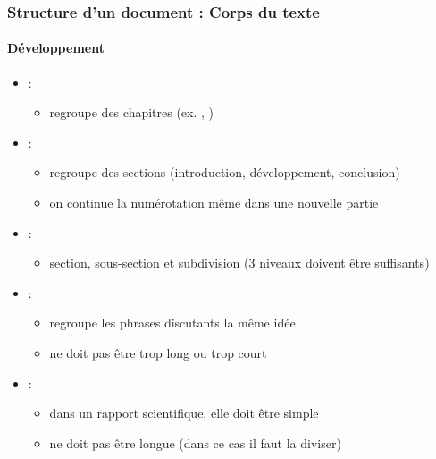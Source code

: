 \documentclass[xcolor=table]{beamer}
\begin{document}
\begin{frame}
\frametitle{Structure d'un document : Corps du texte}
\framesubtitle{Développement}

\begin{itemize}
	\item {} : 
	\begin{itemize}
		\item regroupe des chapitres (ex. , ) 
	\end{itemize}

	\item {} :
	\begin{itemize}
		\item regroupe des sections (introduction, développement, conclusion)
		\item on continue la numérotation même dans une nouvelle partie
	\end{itemize}

	\item {} : 
	\begin{itemize}
		\item section, sous-section et subdivision (3 niveaux doivent être suffisants)
	\end{itemize}

	\item {} : 
	\begin{itemize}
		\item regroupe les phrases discutants la même idée
		\item ne doit pas être trop long ou trop court
	\end{itemize}

	\item {} :
	\begin{itemize}
		\item dans un rapport scientifique, elle doit être simple
		\item ne doit pas être longue (dans ce cas il faut la diviser)
	\end{itemize}
\end{itemize}

\end{frame}
\end{document}
